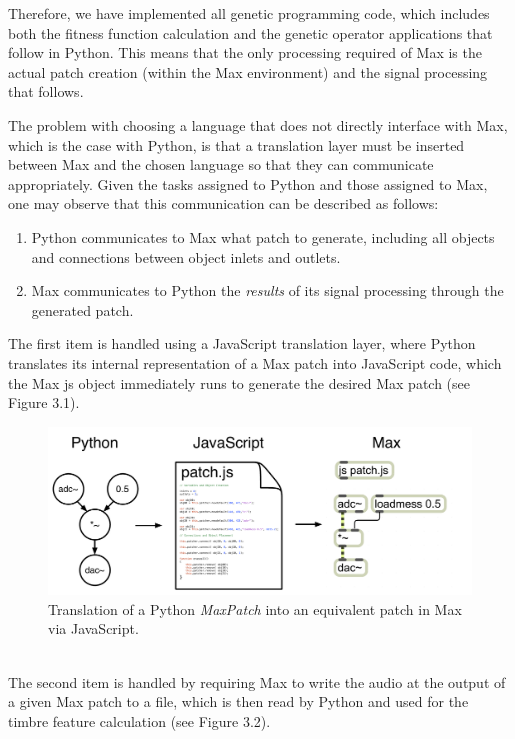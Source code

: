 \documentclass[a4paper,12pt]{report} 	%
\numberwithin{figure}{chapter}
\numberwithin{table}{chapter}
\numberwithin{equation}{chapter}
\begin{document}
\begin{flushleft}
Therefore, we have implemented all genetic programming code, which includes both the fitness function calculation and the genetic operator applications that follow in Python. This means that the only processing required of Max is the actual patch creation (within the Max environment) and the signal processing that follows.

The problem with choosing a language that does not directly interface with Max, which is the case with Python, is that a translation layer must be inserted between Max and the chosen language so that they can communicate appropriately. Given the tasks assigned to Python and those assigned to Max, one may observe that this communication can be described as follows:
\begin{enumerate}
\item Python communicates to Max what patch to generate, including all objects and connections between object inlets and outlets. 
\item Max communicates to Python the \emph{results} of its signal processing through the generated patch.
\end{enumerate}
The first item is handled using a JavaScript translation layer, where Python translates its internal representation of a Max patch into JavaScript code, which the Max js object immediately runs to generate the desired Max patch (see Figure 3.1). 
\begin{figure}[h!]
\begin{center}
\includegraphics[scale=0.4]{JSTranslation}
\caption[Generating a Max patch given a parse-tree]{Translation of a Python \emph{MaxPatch} into an equivalent patch in Max via JavaScript.}
\end{center}
\end{figure}
\\
The second item is handled by requiring Max to write the audio at the output of a given Max patch to a file, which is then read  by Python and used for the timbre feature calculation (see Figure 3.2).
\begin{figure}[h!]

\end{figure}
\end{flushleft}
\end{document}
